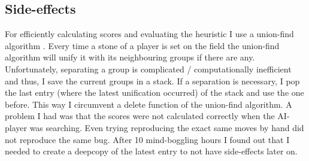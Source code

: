 \documentclass[a4paper]{article}
\begin{document}
\subsection{Side-effects}
For efficiently calculating scores and evaluating the heuristic I use a union-find algorithm \cite{galler1964improved}. Every time a stone of a player is set on the field the union-find algorithm will unify it with its neighbouring groups if there are any. Unfortunately, separating a group is complicated / computationally inefficient and thus, I save the current groups in a stack. If a separation is necessary, I pop the last entry (where the latest unification occurred) of the stack and use the one before. This way I circumvent a delete function of the union-find algorithm.
A problem I had was that the scores were not calculated correctly when the AI-player was searching. Even trying reproducing the exact same moves by hand did not reproduce the same bug. After 10 mind-boggling hours I found out that I needed to create a deepcopy of the latest entry to not have side-effects later on.




\end{document}
